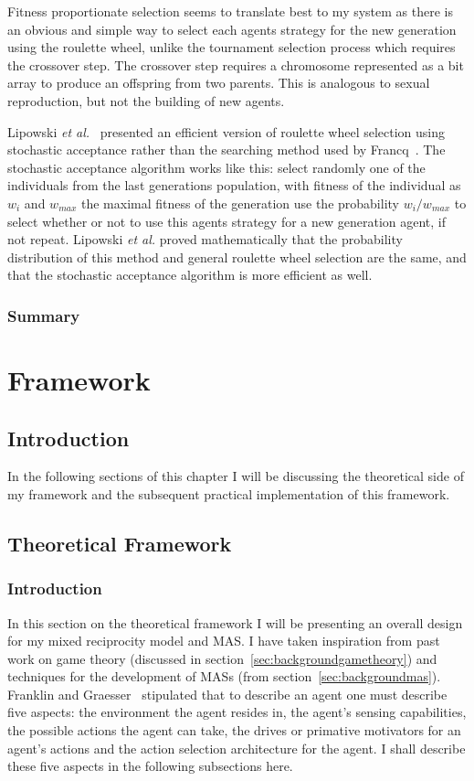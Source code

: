 \documentclass[]{final_report}
\begin{document}
Fitness proportionate selection seems to translate best to my system as there is an obvious and simple way to select each agents strategy for the new generation using the roulette wheel, unlike the tournament selection process which requires the crossover step. The crossover step requires a chromosome represented as a bit array to produce an offspring from two parents. This is analogous to sexual reproduction, but not the building of new agents.\par
Lipowski \textit{et al.}~\cite{lipowski2012roulette} presented an efficient version of roulette wheel selection using stochastic acceptance rather than the searching method used by Francq~\cite{genetic_algorithms}. The stochastic acceptance algorithm works like this: select randomly one of the individuals from the last generations population, with fitness of the individual as $w_i$ and $w_{max}$ the maximal fitness of the generation use the probability $w_i / w_{max}$ to select whether or not to use this agents strategy for a new generation agent, if not repeat. Lipowski \textit{et al.} proved mathematically that the probability distribution of this method and general roulette wheel selection are the same, and that the stochastic acceptance algorithm is more efficient as well.

\subsection{Summary}

\chapter{Framework}

\section{Introduction}
In the following sections of this chapter I will be discussing the theoretical side of my framework and the subsequent practical implementation of this framework.

\section{Theoretical Framework}

\subsection{Introduction}
In this section on the theoretical framework I will be presenting an overall design for my mixed reciprocity model and MAS. I have taken inspiration from past work on game theory (discussed in section~\ref{sec:backgroundgametheory}) and techniques for the development of MASs (from section~\ref{sec:backgroundmas}). Franklin and Graesser~\cite{franklin1996agent} stipulated that to describe an agent one must describe five aspects: the environment the agent resides in, the agent's sensing capabilities, the possible actions the agent can take, the drives or primative motivators for an agent's actions and the action selection architecture for the agent. I shall describe these five aspects in the following subsections here.
\end{document}
